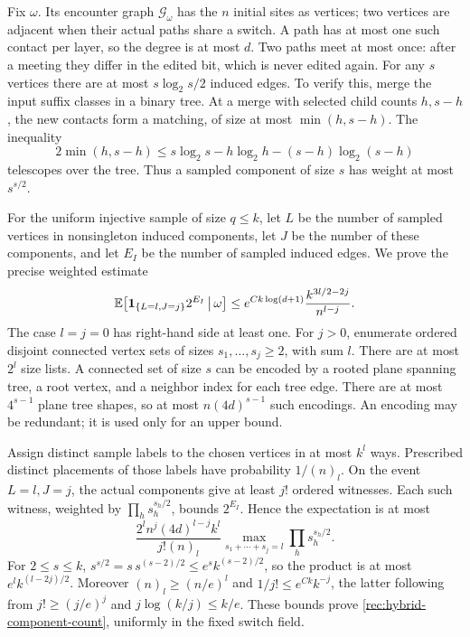 Fix $\omega$. Its encounter graph $\mathcal G_\omega$ has the $n$
initial sites as vertices; two vertices are adjacent when their
actual paths share a switch. A path has at most one such contact per
layer, so the degree is at most $d$. Two paths meet at most once:
after a meeting they differ in the edited bit, which is never edited
again. For any $s$ vertices there are at most $s\log_2s/2$ induced
edges. To verify this, merge the input suffix classes in a binary
tree. At a merge with selected child counts $h,s-h$, the new contacts
form a matching, of size at most $\min(h,s-h)$. The inequality
\[
 2\min(h,s-h)\le
 s\log_2s-h\log_2h-(s-h)\log_2(s-h)
\]
telescopes over the tree. Thus a sampled component of size $s$ has
weight at most $s^{s/2}$.

For the uniform injective sample of size $q\le k$, let $L$ be the
number of sampled vertices in nonsingleton induced components, let
$J$ be the number of these components, and let $E_I$ be the number
of sampled induced edges. We prove the precise weighted estimate
\begin{equation}\label{rec:hybrid-component-count}
 \mathbb E\!\left[{\bf1}_{\{L=l,J=j\}}2^{E_I}
                      \,\middle|\,\omega\right]
 \le e^{Ck\log(d+1)}\frac{k^{3l/2-2j}}{n^{l-j}}.
\end{equation}
The case $l=j=0$ has right-hand side at least one. For $j>0$,
enumerate ordered disjoint connected vertex sets of sizes
$s_1,\ldots,s_j\ge2$, with sum $l$. There are at most $2^l$ size
lists. A connected set of size $s$ can be encoded by a rooted plane
spanning tree, a root vertex, and a neighbor index for each tree
edge. There are at most $4^{s-1}$ plane tree shapes, so at most
$n(4d)^{s-1}$ such encodings. An encoding may be redundant; it is
used only for an upper bound.

Assign distinct sample labels to the chosen vertices in at most
$k^l$ ways. Prescribed distinct placements of those labels have
probability $1/(n)_l$. On the event $L=l,J=j$, the actual components
give at least $j!$ ordered witnesses. Each such witness, weighted by
$\prod_h s_h^{s_h/2}$, bounds $2^{E_I}$. Hence the expectation is
at most
\[
 \frac{2^l n^j(4d)^{l-j}k^l}{j!(n)_l}
       \max_{s_1+\cdots+s_j=l}\prod_hs_h^{s_h/2}.
\]
For $2\le s\le k$,
$s^{s/2}=s\,s^{(s-2)/2}\le e^s k^{(s-2)/2}$, so the product
is at most $e^l k^{(l-2j)/2}$. Moreover
$(n)_l\ge(n/e)^l$ and
$1/j!\le e^{Ck}k^{-j}$, the latter following from
$j!\ge(j/e)^j$ and $j\log(k/j)\le k/e$.
These bounds prove \eqref{rec:hybrid-component-count}, uniformly
in the fixed switch field.

